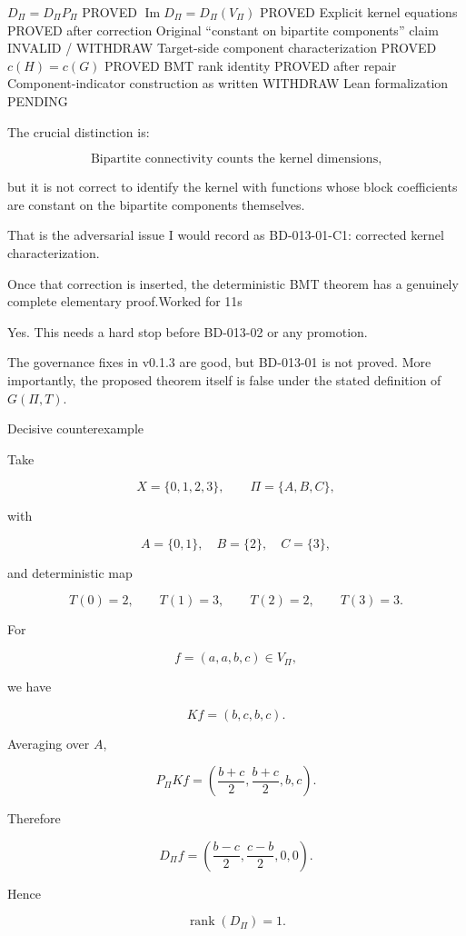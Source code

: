 \(D_\Pi=D_\Pi P_\Pi\)	PROVED
\(\operatorname{Im}D_\Pi=D_\Pi(V_\Pi)\)	PROVED
Explicit kernel equations	PROVED after correction
Original “constant on bipartite components” claim	INVALID / WITHDRAW
Target-side component characterization	PROVED
\(c(H)=c(G)\)	PROVED
BMT rank identity	PROVED after repair
Component-indicator construction as written	WITHDRAW
Lean formalization	PENDING

The crucial distinction is:

\[
\boxed{\text{Bipartite connectivity counts the kernel dimensions,}}  
\]

but it is not correct to identify the kernel with functions whose block coefficients are constant on the bipartite components themselves.

That is the adversarial issue I would record as BD-013-01-C1: corrected kernel characterization.

Once that correction is inserted, the deterministic BMT theorem has a genuinely complete elementary proof.Worked for 11s

Yes. This needs a hard stop before BD-013-02 or any promotion.

The governance fixes in v0.1.3 are good, but BD-013-01 is not proved. More importantly, the proposed theorem itself is false under the stated definition of \(G(\Pi,T)\).

Decisive counterexample

Take

\[
X=\{0,1,2,3\},  
\qquad  
\Pi=\{A,B,C\},  
\]

with

\[
A=\{0,1\},\quad B=\{2\},\quad C=\{3\},  
\]

and deterministic map

\[
T(0)=2,\qquad T(1)=3,\qquad T(2)=2,\qquad T(3)=3.  
\]

For

\[
f=(a,a,b,c)\in V_\Pi,  
\]

we have

\[
Kf=(b,c,b,c).  
\]

Averaging over \(A\),

\[
P_\Pi Kf  
=  
\left(  
\frac{b+c}{2},  
\frac{b+c}{2},  
b,c  
\right).  
\]

Therefore

\[
D_\Pi f  
=  
\left(  
\frac{b-c}{2},  
\frac{c-b}{2},  
0,0  
\right).  
\]

Hence

\[
\boxed{\operatorname{rank}(D_\Pi)=1}.  
\]

